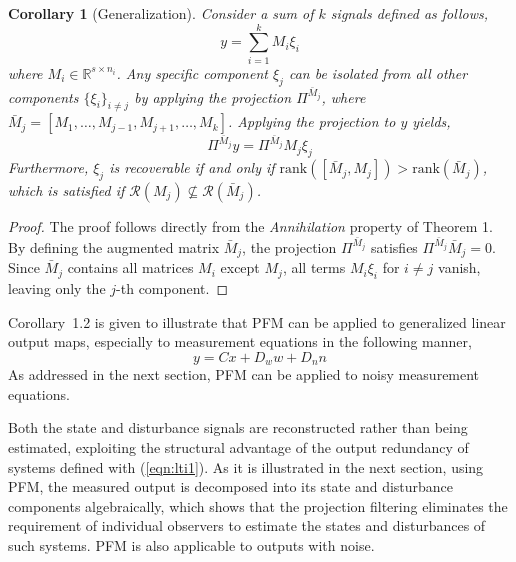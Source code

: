 \documentclass[pdflatex,sn-mathphys-num]{sn-jnl}%
\theoremstyle{thmstyleone}%
\newtheorem{corollary}{Corollary}
\theoremstyle{thmstyletwo}%
\theoremstyle{thmstylethree}%
\begin{document}
\begin{corollary}[Generalization]
Consider a sum of $k$ signals defined as follows,
\begin{equation*}
    y = \sum_{i=1}^k M_i \xi_i
\end{equation*}
where $M_i \in \mathbb{R}^{s \times n_i}$. Any specific component $\xi_j$ can be isolated from all other components $\{ \xi_i \}_{i \neq j}$ by applying the projection $\Pi^{\bar{M}_j}$, where $\bar{M}_j = [M_1, \dots, M_{j-1}, M_{j+1}, \dots, M_k]$. Applying the projection to $y$ yields,
\begin{equation*}
    \Pi^{\bar{M}_j} y = \Pi^{\bar{M}_j} M_j \xi_j
\end{equation*}
Furthermore, $\xi_j$ is recoverable if and only if $\mathrm{rank}([\bar{M}_j, M_j]) > \mathrm{rank}(\bar{M}_j)$, which is satisfied if $\mathcal{R}(M_j) \not\subseteq \mathcal{R}(\bar{M}_j)$.
\end{corollary}

\begin{proof}
The proof follows directly from the \textit{Annihilation} property of Theorem 1. By defining the augmented matrix $\bar{M}_j$, the projection $\Pi^{\bar{M}_j}$ satisfies $\Pi^{\bar{M}_j} \bar{M}_j = 0$. Since $\bar{M}_j$ contains all matrices $M_i$ except $M_j$, all terms $M_i \xi_i$ for $i \neq j$ vanish, leaving only the $j$-th component.
\end{proof}

Corollary~1.2 is given to illustrate that PFM can be applied to generalized linear output maps, especially to measurement equations in the following manner,
\begin{equation} 
    y=Cx+D_w w+D_n n
\end{equation} 
As addressed in the next section, PFM can be applied to noisy measurement equations. 

Both the state and disturbance signals are reconstructed rather than being estimated, exploiting the structural advantage of the output redundancy of systems defined with (\ref{eqn:lti1}). As it is illustrated in the next section, using PFM, the measured output is decomposed into its state and disturbance components algebraically, which shows that the projection filtering eliminates the requirement of individual observers to estimate the states and disturbances of such systems. PFM is also applicable to outputs with noise.


\end{document}
